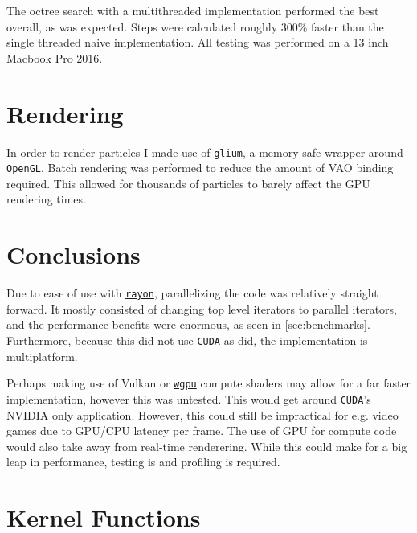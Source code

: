 \documentclass[sigplan,screen]{acmart}
\begin{document}
The octree search with a multithreaded implementation performed the best overall, as was expected. Steps were calculated roughly 300\% faster than the single threaded naive implementation. All testing was performed on a 13 inch Macbook Pro 2016.

\section{Rendering}

In order to render particles I made use of \href{https://docs.rs/glium/latest/glium/}{\texttt{glium}}, a memory safe wrapper around \texttt{OpenGL}. Batch rendering was performed to reduce the amount of VAO binding required. This allowed for thousands of particles to barely affect the GPU rendering times.

\section{Conclusions}

Due to ease of use with \href{https://docs.rs/rayon/latest/rayon/}{\texttt{rayon}}, parallelizing the code was relatively straight forward. It mostly consisted of changing top level iterators to parallel iterators, and the performance benefits were enormous, as seen in \ref{sec:benchmarks}. Furthermore, because this did not use \texttt{CUDA} as \cite{Muller} did, the implementation is multiplatform.

Perhaps making use of Vulkan or \href{https://docs.rs/wgpu/latest/wgpu/}{\texttt{wgpu}} compute shaders may allow for a far faster implementation, however this was untested. This would get around \texttt{CUDA}'s NVIDIA only application. However, this could still be impractical for e.g. video games due to GPU/CPU latency per frame. The use of GPU for compute code would also take away from real-time renderering. While this could make for a big leap in performance, testing is and profiling is required.




\appendix

\section{Kernel Functions}
\label{sec:kernel_functions}
\end{document}

